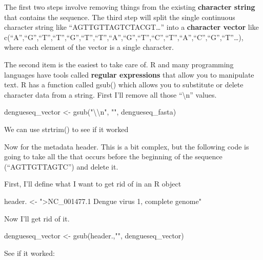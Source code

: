 \documentclass[
]{book}
\newenvironment{Shaded}{\begin{snugshade}}{\end{snugshade}}
\newcommand{\FunctionTok}[1]{\textcolor[rgb]{0.00,0.00,0.00}{#1}}
\newcommand{\NormalTok}[1]{#1}
\newcommand{\OtherTok}[1]{\textcolor[rgb]{0.56,0.35,0.01}{#1}}
\newcommand{\SpecialCharTok}[1]{\textcolor[rgb]{0.00,0.00,0.00}{#1}}
\newcommand{\StringTok}[1]{\textcolor[rgb]{0.31,0.60,0.02}{#1}}
\begin{document}
The first two steps involve removing things from the existing \textbf{character string} that contains the sequence. The third step will split the single continuous character string like ``AGTTGTTAGTCTACGT\ldots{}'' into a \textbf{character vector} like c(``A'',``G'',``T'',``T'',``G'',``T'',``T'',``A'',``G'',``T'',``C'',``T'',``A'',``C'',``G'',``T''\ldots), where each element of the vector is a single character.

The second item is the easiest to take care of. R and many programming languages have tools called \textbf{regular expressions} that allow you to manipulate text. R has a function called gsub() which allows you to substitute or delete character data from a string. First I'll remove all those ``\textbackslash n'' values.

\begin{Shaded}
\begin{Highlighting}[]
\NormalTok{dengueseq\_vector }\OtherTok{\textless{}{-}} \FunctionTok{gsub}\NormalTok{(}\StringTok{"}\SpecialCharTok{\textbackslash{}\textbackslash{}}\StringTok{n"}\NormalTok{, }\StringTok{""}\NormalTok{, dengueseq\_fasta)}
\end{Highlighting}
\end{Shaded}

We can use strtrim() to see if it worked

Now for the metadata header. This is a bit complex, but the following code is going to take all the that occurs before the beginning of the sequence (``AGTTGTTAGTC'') and delete it.

First, I'll define what I want to get rid of in an R object

\begin{Shaded}
\begin{Highlighting}[]
\NormalTok{header. }\OtherTok{\textless{}{-}} \StringTok{"\textgreater{}NC\_001477.1 Dengue virus 1, complete genome"}
\end{Highlighting}
\end{Shaded}

Now I'll get rid of it.

\begin{Shaded}
\begin{Highlighting}[]
\NormalTok{dengueseq\_vector }\OtherTok{\textless{}{-}} \FunctionTok{gsub}\NormalTok{(header.,}\StringTok{""}\NormalTok{, dengueseq\_vector)}
\end{Highlighting}
\end{Shaded}

See if it worked:
\end{document}
